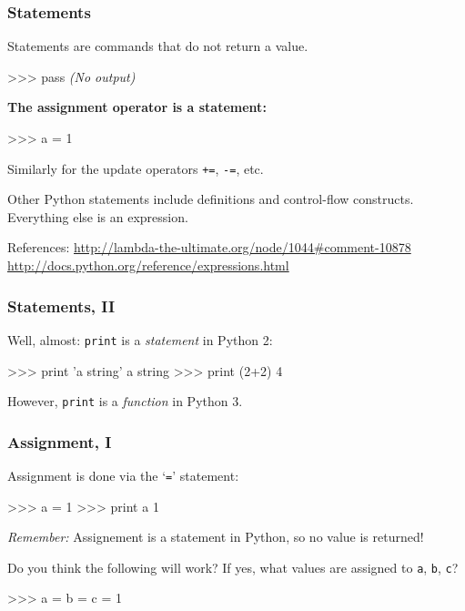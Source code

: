 \documentclass[english,serif,mathserif,xcolor=pdftex,dvipsnames,table]{beamer}
\begin{document}
\begin{frame}[fragile]
  \frametitle{Statements}
  Statements are commands that do not return a value.
\begin{semiverbatim}
>>> pass
{\small\it (No output)}
\end{semiverbatim}

  \+
  \textbf{The assignment operator is a statement:}
\begin{semiverbatim}
>>> a = 1
\end{semiverbatim}
  Similarly for the update operators \texttt{+=}, \texttt{-=}, etc.

  \+
  Other Python statements include definitions and
  control-flow constructs.  Everything else is an expression. 

  \+\scriptsize
  References:
  \url{http://lambda-the-ultimate.org/node/1044#comment-10878}
  \url{http://docs.python.org/reference/expressions.html}
  
\end{frame}


\begin{frame}[fragile]
  \frametitle{Statements, II}
  Well, almost: \texttt{print} is a \emph{statement} in Python 2:
\begin{semiverbatim}
>>> print 'a string'
a string
>>> print (2+2)
4
\end{semiverbatim}
  However, \texttt{print} is a \emph{function} in Python 3.

\end{frame}


\begin{frame}[fragile]
  \frametitle{Assignment, I}
  Assignment is done via the `\texttt{=}' statement:
\begin{semiverbatim}
>>> a = 1
>>> print a
1
\end{semiverbatim}
  \emph{Remember:} Assignement is a statement in Python, so no value is
  returned!

  \+
  \begin{question}
    Do you think the following will work?  If yes, what values are
    assigned to \texttt{a}, \texttt{b}, \texttt{c}?
    \begin{semiverbatim}
      >>> a = b = c = 1
    \end{semiverbatim}
  \end{question}
\end{frame}
\end{document}

